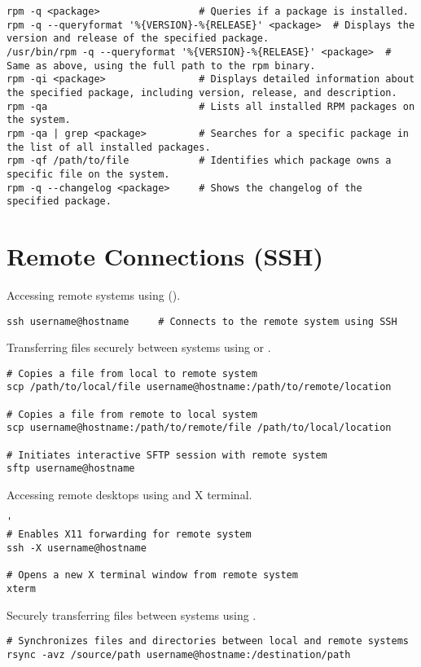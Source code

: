 \begin{lstlisting}
rpm -q <package>                 # Queries if a package is installed.
rpm -q --queryformat '%{VERSION}-%{RELEASE}' <package>  # Displays the version and release of the specified package.
/usr/bin/rpm -q --queryformat '%{VERSION}-%{RELEASE}' <package>  # Same as above, using the full path to the rpm binary.
rpm -qi <package>                # Displays detailed information about the specified package, including version, release, and description.
rpm -qa                          # Lists all installed RPM packages on the system.
rpm -qa | grep <package>         # Searches for a specific package in the list of all installed packages.
rpm -qf /path/to/file            # Identifies which package owns a specific file on the system.
rpm -q --changelog <package>     # Shows the changelog of the specified package.
\end{lstlisting}




\section{Remote Connections (SSH)}


Accessing remote systems using  ().
\begin{lstlisting}
ssh username@hostname     # Connects to the remote system using SSH
\end{lstlisting}

Transferring files securely between systems using  or .
\begin{lstlisting}
# Copies a file from local to remote system
scp /path/to/local/file username@hostname:/path/to/remote/location

# Copies a file from remote to local system
scp username@hostname:/path/to/remote/file /path/to/local/location

# Initiates interactive SFTP session with remote system
sftp username@hostname    
\end{lstlisting}

Accessing remote desktops using  and X terminal.
\begin{lstlisting}'
# Enables X11 forwarding for remote system
ssh -X username@hostname

# Opens a new X terminal window from remote system
xterm        
\end{lstlisting}

Securely transferring files between systems using .
\begin{lstlisting}
# Synchronizes files and directories between local and remote systems
rsync -avz /source/path username@hostname:/destination/path
\end{lstlisting}

